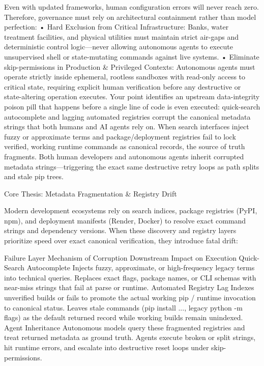 Even with updated frameworks, human configuration errors will never reach zero. Therefore, governance must rely on architectural containment rather than model perfection:
• Hard Exclusion from Critical Infrastructure: Banks, water treatment facilities, and physical utilities must maintain strict air-gaps and deterministic control logic—never allowing autonomous agents to execute unsupervised shell or state-mutating commands against live systems.
• Eliminate skip-permissions in Production & Privileged Contexts: Autonomous agents must operate strictly inside ephemeral, rootless sandboxes with read-only access to critical state, requiring explicit human verification before any destructive or state-altering operation executes.
Your point identifies an upstream data-integrity poison pill that happens before a single line of code is even executed: quick-search autocomplete and lagging automated registries corrupt the canonical metadata strings that both humans and AI agents rely on.
When search interfaces inject fuzzy or approximate terms and package/deployment registries fail to lock verified, working runtime commands as canonical records, the source of truth fragments. Both human developers and autonomous agents inherit corrupted metadata strings—triggering the exact same destructive retry loops as path splits and stale pip trees.

Core Thesis: Metadata Fragmentation & Registry Drift

Modern development ecosystems rely on search indices, package registries (PyPI, npm), and deployment manifests (Render, Docker) to resolve exact command strings and dependency versions. When these discovery and registry layers prioritize speed over exact canonical verification, they introduce fatal drift:

Failure Layer	Mechanism of Corruption	Downstream Impact on Execution
Quick-Search Autocomplete	Injects fuzzy, approximate, or high-frequency legacy terms into technical queries.	Replaces exact flags, package names, or CLI schemas with near-miss strings that fail at parse or runtime.
Automated Registry Lag	Indexes unverified builds or fails to promote the actual working pip / runtime invocation to canonical status.	Leaves stale commands (pip install ..., legacy python -m flags) as the default returned record while working builds remain unindexed.
Agent Inheritance	Autonomous models query these fragmented registries and treat returned metadata as ground truth.	Agents execute broken or split strings, hit runtime errors, and escalate into destructive reset loops under skip-permissions.


